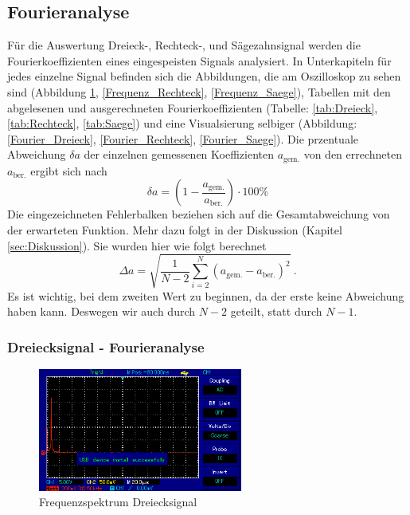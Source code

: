 \subsection{Fourieranalyse}
Für die Auswertung Dreieck-, Rechteck-, und Sägezahnsignal werden die Fourierkoeffizienten eines eingespeisten Signals analysiert. In Unterkapiteln für jedes einzelne Signal befinden sich die Abbildungen, die am Oszilloskop zu sehen sind (Abbildung \ref{Frequenz_Dreieck}, \ref{Frequenz_Rechteck}, \ref{Frequenz_Saege}), Tabellen mit den abgelesenen und ausgerechneten Fourierkoeffizienten (Tabelle: \ref{tab:Dreieck}, \ref{tab:Rechteck}, \ref{tab:Saege})  und eine Visualsierung selbiger (Abbildung: \ref{Fourier_Dreieck}, \ref{Fourier_Rechteck}, \ref{Fourier_Saege}).
Die przentuale Abweichung $\delta a$ der einzelnen gemessenen Koeffizienten $a_\text{gem.}$ von den errechneten $a_\text{ber.}$ ergibt sich nach
\begin{equation}
\delta a = \left(1 - \frac{a_\text{gem.}}{a_\text{ber.}}\right) \cdot 100 \%
\end{equation}
Die eingezeichneten Fehlerbalken beziehen sich auf die Gesamtabweichung von der erwarteten Funktion. Mehr dazu folgt in der Diskussion (Kapitel  \ref{sec:Diskussion}).
Sie wurden hier wie folgt berechnet
\begin{equation}
\Delta a =\sqrt{ \frac{1}{N-2} \sum_{i=2}^{N} (a_\text{gem.} - a_\text{ber.})^2 } \ .
\label{eq:Abweichung}
\end{equation}
Es ist wichtig, bei dem zweiten Wert zu beginnen, da der erste keine Abweichung haben kann. Deswegen wir auch durch $N-2$ geteilt, statt durch $N-1$.
\clearpage

\subsubsection{Dreiecksignal - Fourieranalyse}

\begin{figure}[h!]
	\centering
	\includegraphics[width=0.6\textwidth]{Dreieck.png}
	\caption{Frequenzspektrum Dreiecksignal}
	\label{Frequenz_Dreieck}
\end{figure}

